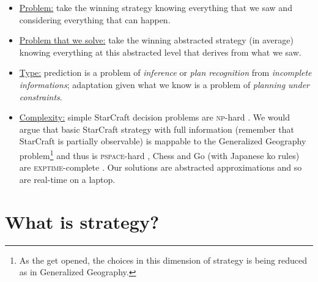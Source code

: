 \begin{itemize}
\item \underline{Problem:} take the winning strategy knowing everything that we saw and considering everything that can happen.
\item \underline{Problem that we solve:} take the winning abstracted strategy (in average) knowing everything at this abstracted level that derives from what we saw.
\item \underline{Type:} prediction is a problem of \textit{inference} or \textit{plan recognition} from \textit{incomplete informations}; adaptation given what we know is a problem of \textit{planning under constraints}.
\item \underline{Complexity:} simple StarCraft decision problems are \textsc{np}-hard \citep{GamingComplexity}. We would argue that basic StarCraft strategy with full information (remember that StarCraft is partially observable) is mappable to the Generalized Geography problem\footnote{As the  get opened, the choices in this dimension of strategy is being reduced as in Generalized Geography.} and thus is \textsc{pspace}-hard \citep{Lichtenstein78},
Chess \citep{Fraenkel81} and Go (with Japanese ko rules) are \textsc{exptime}-complete \citep{Robson83}. Our solutions are abstracted approximations and so are real-time on a laptop. %
\end{itemize}

\section{What is strategy?}
\label{sec:whatisstrategy}


